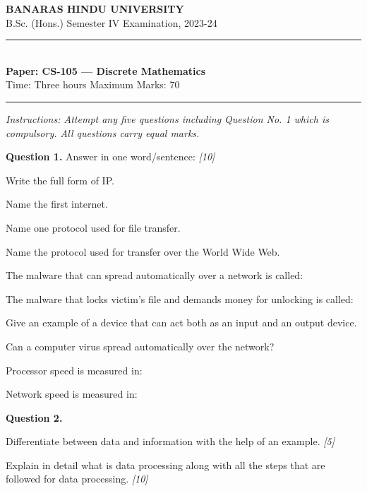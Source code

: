\documentclass[11pt,a4paper]{article}
\newcommand{\pts}[1]{\hfill   \textit{[#1]}}
\begin{document}
\begin{center}
  {\large\bfseries BANARAS HINDU UNIVERSITY}\\[2pt]
  {\normalsize B.Sc. (Hons.) Semester IV Examination, 2023-24}\\[6pt]
  \rule{0.8\linewidth}{0.5pt}\\[6pt]
  {\large\bfseries Paper: CS-105 --- Discrete Mathematics}\\[4pt]
  {\normalsize Time: Three hours \hfill Maximum Marks: 70}
\end{center}

\rule{\linewidth}{0.4pt}

\smallskip



\noindent   \textit{Instructions: Attempt any five questions including Question No. 1 which is compulsory. All questions carry equal marks.}

\bigskip

\medskip


\noindent   \textbf{Question 1.} Answer in one word/sentence: \pts{10}

\begin{parts}
  \item Write the full form of IP.
  \item Name the first internet.
  \item Name one protocol used for file transfer.
  \item Name the protocol used for transfer over the World Wide Web.
  \item The malware that can spread automatically over a network is called:
  \item The malware that locks victim's file and demands money for unlocking is called:
  \item Give an example of a device that can act both as an input and an output device.
  \item Can a computer virus spread automatically over the network?
  \item Processor speed is measured in:
  \item Network speed is measured in:
\end{parts}

\medskip


\noindent   \textbf{Question 2.}

\begin{parts}
  \item Differentiate between data and information with the help of an example. \pts{5}
  \item Explain in detail what is data processing along with all the steps that are followed for data processing. \pts{10}
\end{parts}
\end{document}
